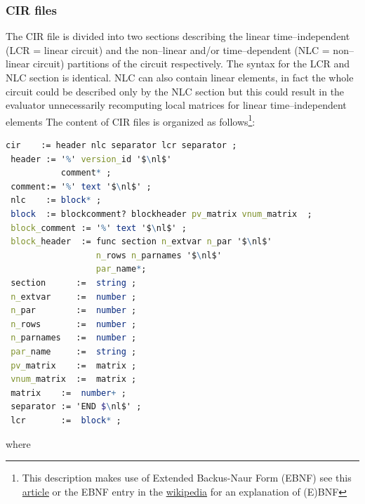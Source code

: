 \documentclass{scrartcl}
\let\tt=\normalfont\ttfamily
\let\bf=\normalfont\bfseries
\newcommand{\nlc}{{\tt NLC}}
\newcommand{\cir}{{\tt CIR}}
\newcommand{\lcr}{{\tt LCR}}
\newcommand{\nl}{{\tt \backslash n}}
\begin{document}
\subsubsection{{\cir} files}
The {\cir} file is divided into two sections describing the linear 
time--independent ({\lcr} = {\bf l}inear {\bf c}i{\bf r}cuit) and the 
non--linear and/or time--dependent  ({\nlc} = {\bf n}on--{\bf l}inear 
{\bf c}ircuit) partitions of the circuit respectively. 
The syntax for the {\lcr} and {\nlc} section is identical. 
{\nlc} can also contain linear elements, in fact the whole circuit could be 
described only by the {\nlc} 
section but this could result in the evaluator unnecessarily recomputing local 
matrices for linear 
time--independent elements
The content of {\cir} files is organized as follows\footnote{ This description 
makes use of Extended Backus-Naur Form (EBNF) see this 
\hyperref{http://www.garshol.priv.no/download/text/bnf.html}{}{}{article} 
or the EBNF entry in the \hyperref{http://en.wikipedia.org}{}{}{wikipedia} 
for an explanation of (E)BNF }:

\begin{lstlisting}[language=Mathematica,mathescape=true,backgroundcolor={}]
 cir    := header nlc separator lcr separator ;
 header := '%' version_id '$\nl$' 
           comment* ;
 comment:= '%' text '$\nl$' ;
 nlc    := block* ;
 block  := blockcomment? blockheader pv_matrix vnum_matrix  ;
 block_comment := '%' text '$\nl$' ;
 block_header  := func section n_extvar n_par '$\nl$'  
                  n_rows n_parnames '$\nl$' 
                  par_name*;
 section      :=  string ; 
 n_extvar     :=  number ; 
 n_par        :=  number ; 
 n_rows       :=  number ;
 n_parnames   :=  number ;
 par_name     :=  string ; 
 pv_matrix    :=  matrix ;
 vnum_matrix  :=  matrix ;
 matrix    :=  number+ ; 
 separator := 'END $\nl$' ; 
 lcr       :=  block* ; 
\end{lstlisting}

where
\end{document}
